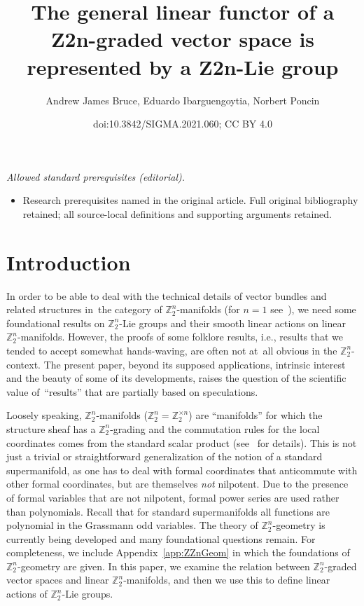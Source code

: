 \documentclass[10pt,a4paper]{amsart}
\title{The general linear functor of a Z2n-graded vector space is represented by a Z2n-Lie group}
\author{Andrew James Bruce, Eduardo Ibarguengoytia, Norbert Poncin}
\date{doi:10.3842/SIGMA.2021.060; CC BY 4.0}
\newcommand{\Z}{{\mathbb Z}}
\newcommand{\0}{\otimes}
\newcommand{\z}{\Z_2^n}
\numberwithin{equation}{section}
\begin{document}
\maketitle
\noindent\textit{Allowed standard prerequisites (editorial).}\begin{itemize}
\item Research prerequisites named in the original article. Full original bibliography retained; all source-local definitions and supporting arguments retained.
\end{itemize}\medskip
\section{Introduction}

In order to be able to deal with the technical details of vector bundles and related structures in~the category of $\z$-manifolds (for $n=1$ see~\cite{Balduzzi:2011}), we need some foundational results on $\z$-Lie groups and their smooth linear actions on linear $\z$-manifolds. However, the proofs of some folklore results, i.e., results that we tended to accept somewhat hands-waving, are often not at~all obvious in the $\z$-context. The present paper, beyond its supposed applications, intrinsic interest and the beauty of some of its developments, raises the question of the scientific value of~``results'' that are partially based on speculations.

Loosely speaking, $\Z_{2}^{n}$-manifolds ($\z=\Z_2^{\times n}$) are ``manifolds'' for which the structure sheaf has a $\Z_{2}^{n}$-grading and the commutation rules for the local coordinates comes from the standard scalar product (see~\cite{BruceGrabowski, Bruce:2019b, Bruce:2018, Bruce:2019,Covolo:2016,Covolo:2016a,Covolo:2016b, Covolo:2016c, Poncin:2016} for details). This is not just a trivial or straightforward generalization of the notion of a standard supermanifold, as one has to deal with formal coordinates that anticommute with other formal coordinates, but are themselves \emph{not} nilpotent. Due to the presence of formal variables that are not nilpotent, formal power series are used rather than polynomials. Recall that for standard supermanifolds all functions are polynomial in the Grassmann odd variables. The theory of $\Z_2^n$-geometry is currently being developed and many foundational questions remain. For completeness, we include Appendix~\ref{app:ZZnGeom} in which the foundations of $\Z_2^n$-geometry are given. In this paper, we examine the relation between $\Z_2^n$-graded vector spaces and linear $\Z_2^n$-manifolds, and then we use this to define linear actions of $\Z_2^n$-Lie groups.
\end{document}
